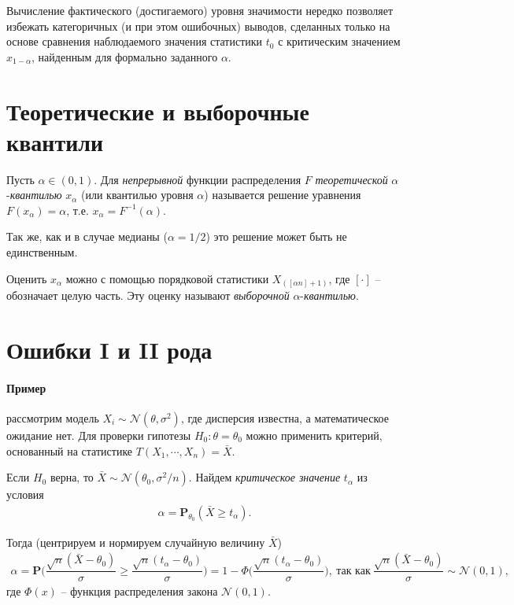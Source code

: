 \documentclass[%
	11pt,
	a4paper,
	utf8,
		]{article}
\begin{document}
Вычисление фактического (достигаемого) уровня значимости нередко позволяет избежать категоричных (и при этом ошибочных) выводов, сделанных только на основе сравнения наблюдаемого значения статистики $ t_0 $ с критическим значением $ x_{1 - \alpha} $, найденным для формально заданного $ \alpha $.


\section{Теоретические и выборочные квантили}

Пусть $ \alpha \in (0, 1) $. Для \emph{непрерывной} функции распределения $ F $ \emph{теоретической} $ \alpha $-\emph{квантилью} $ x_\alpha $ (или квантилью уровня $ \alpha $) называется решение уравнения $ F(x_\alpha) = \alpha $, т.е. $ x_\alpha = F^{-1}(\alpha) $.

Так же, как и в случае медианы ($ \alpha = 1/2 $) это решение может быть не единственным.

Оценить $ x_\alpha $ можно с помощью порядковой статистики $ X_{([\alpha n] + 1)} $, где $ [\cdot] $ -- обозначает целую часть. Эту оценку называют \emph{выборочной} $ \alpha $-\emph{квантилью}.

\section{Ошибки I и II рода}

\paragraph{Пример} рассмотрим модель $ X_i \sim \mathcal{N}(\theta, \sigma^2) $, где дисперсия известна, а математическое ожидание нет. Для проверки гипотезы $ H_0: \theta = \theta_0 $ можно применить критерий, основанный на статистике $ T(X_1, \cdots, X_n) = \bar{X} $.

Если $ H_0 $ верна, то $ \bar{X} \sim \mathcal{N}(\theta_0, \sigma^2/n) $. Найдем \emph{критическое значение} $ t_\alpha $ из условия
\begin{align*}
	\alpha = \mathbf{P}_{\theta_0} (\bar{X} \geqslant t_\alpha).
\end{align*}

Тогда (центрируем и нормируем случайную величину $ \bar{X} $)
\begin{align*}
	\alpha = \mathbf{P} \Bigg( \dfrac{\sqrt{n} (\bar{X} - \theta_0)}{\sigma} \geqslant \dfrac{\sqrt{n} (t_\alpha - \theta_0)}{\sigma} \Bigg) = 1 - \Phi\Bigg(\dfrac{\sqrt{n} (t_\alpha - \theta_0)}{\sigma}\Bigg), \ \text{так как} \ \dfrac{\sqrt{n} (\bar{X} - \theta_0)}{\sigma} \sim \mathcal{N}(0, 1),
\end{align*}
где $ \Phi(x) $ -- функция распределения закона $ \mathcal{N}(0, 1) $.
\end{document}
